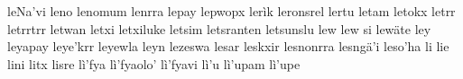\documentclass[a4paper]{article}
\begin{document}
leNa'vi\hspace{2mm}
leno\hspace{2mm}
lenomum\hspace{2mm}
lenrra\hspace{2mm}
lepay\hspace{2mm}
lepwopx\hspace{2mm}
lerìk\hspace{2mm}
leronsrel\hspace{2mm}
lertu\hspace{2mm}
letam\hspace{2mm}
letokx\hspace{2mm}
letrr\hspace{2mm}
letrrtrr\hspace{2mm}
letwan\hspace{2mm}
letxi\hspace{2mm}
letxiluke\hspace{2mm}
letsim\hspace{2mm}
letsranten\hspace{2mm}
letsunslu\hspace{2mm}
lew\hspace{2mm}
lew si\hspace{2mm}
lewäte\hspace{2mm}
ley\hspace{2mm}
leyapay\hspace{2mm}
leye'krr\hspace{2mm}
leyewla\hspace{2mm}
leyn\hspace{2mm}
lezeswa\hspace{2mm}
lesar\hspace{2mm}
leskxir\hspace{2mm}
lesnonrra\hspace{2mm}
lesngä'i\hspace{2mm}
leso'ha\hspace{2mm}
li\hspace{2mm}
lie\hspace{2mm}
lini\hspace{2mm}
litx\hspace{2mm}
lisre\hspace{2mm}
lì'fya\hspace{2mm}
lì'fyaolo'\hspace{2mm}
lì'fyavi\hspace{2mm}
lì'u\hspace{2mm}
lì'upam\hspace{2mm}
lì'upe\hspace{2mm}
\end{document}
